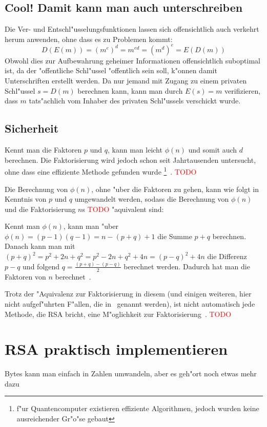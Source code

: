 \documentclass[12pt]{article}
\newcommand{\todo}[1]{\textcolor{red}{\mbox{TODO}}\marginpar{\textcolor{red}{#1}}}
\begin{document}
\subsection{Cool! Damit kann man auch unterschreiben}

Die Ver- und Entschl"usselungsfunktionen lassen sich offensichtlich
auch verkehrt herum anwenden, ohne dass es zu Problemen kommt:
\[D(E(m)) = (m^e)^d = m^{ed} = (m^d)^e = E(D(m))\]
Obwohl dies zur Aufbewahrung geheimer Informationen offensichtlich suboptimal ist,
da der "offentliche Schl"ussel "offentlich sein soll, k"onnen damit Unterschriften erstellt werden.
Da nur jemand mit Zugang zu einem privaten Schl"ussel $s = D(m)$ berechnen kann,
kann man durch $E(s) = m$ verifizieren, dass $m$ tats"achlich vom
Inhaber des privaten Schl"ussels verschickt wurde.

\subsection{Sicherheit}

Kennt man die Faktoren $p$ und $q$, kann man leicht $\phi(n)$ und somit auch $d$ berechnen.
Die Faktorisierung wird jedoch schon seit Jahrtausenden untersucht,
ohne dass eine effiziente Methode gefunden wurde%
\footnote{f"ur Quantencomputer existieren effiziente Algorithmen,
jedoch wurden keine ausreichender Gr"o"se gebaut}~\cite{rsa}. \todo{Reichen die Beispiele hier?}

Die Berechnung von $\phi(n)$, ohne "uber die Faktoren zu gehen,
kann wie folgt in Kenntnis von $p$ und $q$ umgewandelt werden, sodass die Berechnung von $\phi(n)$
und die Faktorisierung $n$s \todo{Besser aussehen lassen} "aquivalent sind:

Kennt man $\phi(n)$, kann man "uber $\phi(n) = (p-1)(q-1) = n - (p+q) + 1$
die Summe $p+q$ berechnen.
Danach kann man mit $(p+q)^2 = p^2 + 2n + q^2 = p^2 - 2n + q^2 + 4n = (p-q)^2 + 4n$
die Differenz $p-q$ und folgend $q = \frac{(p+q) - (p-q)}{2}$ berechnet werden.
Dadurch hat man die Faktoren von $n$ berechnet~\cite{rsa}.

Trotz der "Aquivalenz zur Faktorisierung in diesem (und einigen weiteren,
hier nicht aufgef"uhrten F"allen, die in~\cite{rsa} genannt werden),
ist nicht automatisch jede Methode, die RSA bricht, eine M"oglichkeit
zur Faktorisierung~\cite{sinews}.
\todo{Die Quelle bezieht sich auf doi:10.1.1.73.7840, lieber direkt zitieren?}

\section{RSA praktisch implementieren}
Bytes kann man einfach in Zahlen umwandeln, aber es geh"ort noch etwas mehr dazu
\end{document}
